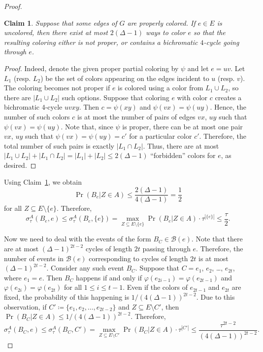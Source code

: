 \documentclass[10pt]{article}
\numberwithin{equation}{subsection}
\newtheorem{small_claim}{Claim}[theo]
\theoremstyle{definition}
\newcommand*{\myproofname}{Proof}
\newenvironment{claimproof}[1][\myproofname]{\begin{proof}[#1]\renewcommand*{\qedsymbol}{\(\dashv\)}}{\end{proof}}
\renewcommand{\qedsymbol}{$\blacksquare$}
\begin{document}
\begin{proof}
		\begin{small_claim}\label{claim:acyclicext}
			Suppose that some edges of $G$ are properly colored. If $e \in E$ is uncolored, then there exist at most $2(\Delta-1)$ ways to color $e$ so that the resulting coloring either is not proper, or contains a bichromatic $4$-cycle going through $e$.
		\end{small_claim}
		\begin{claimproof}	
			Indeed, denote the given proper partial coloring by $\psi$ and let $e = uv$. Let $L_1$ (resp. $L_2$) be the set of colors appearing on the edges incident to $u$ (resp. $v$). The coloring becomes not proper if $e$ is colored using a color from $L_1 \cup L_2$, so there are $|L_1 \cup L_2 |$ such options. Suppose that coloring $e$ with color $c$ creates a bichromatic $4$-cycle $uvxy$. Then $c = \psi(xy)$ and $\psi(vx) = \psi(uy)$. Hence, the number of such colors $c$ is at most the number of pairs of edges $vx$, $uy$ such that $\psi(vx) = \psi(uy)$. Note that, since $\psi$ is proper, there can be at most one pair $vx$, $uy$ such that $\psi(vx) = \psi(uy) = c'$ for a particular color $c'$. Therefore, the total number of such pairs is exactly $|L_1 \cap L_2|$. Thus, there are at most $|L_1 \cup L_2| + |L_1 \cap L_2| = |L_1| + |L_2| \leq 2(\Delta - 1)$ ``forbidden'' colors for $e$, as desired.
		\end{claimproof}
		
		Using Claim~\ref{claim:acyclicext}, we obtain
		$$
			\Pr(B_e \vert Z \in A) \leq \frac{2(\Delta - 1)}{4(\Delta - 1)} = \frac{1}{2}
		$$
		for all $Z \subseteq E \setminus \{e\}$. Therefore,
		$$
			\sigma^A_\tau(B_e, e) \leq \sigma^A_\tau(B_e, \{e\}) = \max_{Z \subseteq E \setminus \{e\}} \Pr(B_e \vert Z \in A) \cdot \tau^{|\{e\}|} \leq  \frac{\tau}{2}.
		$$
		
		Now we need to deal with the events of the form $B_C \in \mathcal{B}(e)$. Note that there are at most $(\Delta - 1)^{2t - 2}$ cycles of length $2t$ passing through $e$. Therefore, the number of events in $\mathcal{B}(e)$ corresponding to cycles of length $2t$ is at most $(\Delta-1)^{2t-2}$. Consider any such event $B_C$. Suppose that $C = e_1$, $e_2$, \ldots, $e_{2t}$, where $e_1 = e$. Then $B_C$  happens if and only if $\varphi(e_{2i-1}) = \varphi(e_{2t-1})$ and $\varphi(e_{2i}) = \varphi(e_{2t})$ for all $1 \leq i \leq t-1$. Even if the colors of $e_{2t-1}$ and $e_{2t}$ are fixed, the probability of this happening is $1/(4(\Delta - 1))^{2t-2}$. Due to this observation, if $C' \coloneqq \{e_1, e_2, \ldots, e_{2t-2}\}$ and $Z \subseteq E \setminus C'$, then $\Pr(B_C\vert Z \in A) \leq 1/(4(\Delta - 1))^{2t-2}$. Therefore,
		$$
			\sigma^A_\tau(B_C, e) \leq \sigma^A_\tau(B_C, C') = \max_{Z \subseteq E \setminus C'} \Pr(B_C \vert Z \in A) \cdot \tau^{|C'|}\leq \frac{\tau^{2t-2}}{(4(\Delta - 1))^{2t-2}}.
		$$
		 

\end{proof}
\end{document}
